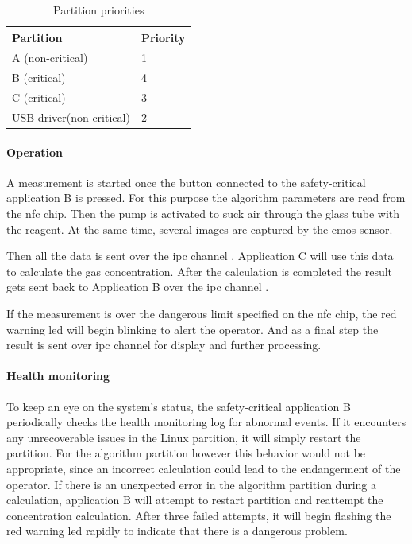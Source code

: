 \begin{table}[h!]
\centering
\begin{tabular}{l|l}
\textbf{Partition} & \textbf{Priority} \\ \hline
A (non-critical)                             & 1                                           \\ \hline
B (critical)                                 & 4                                           \\ \hline
C (critical)                                 & 3                                           \\ \hline
USB driver(non-critical)                     & 2                                          
\end{tabular}
\caption{Partition priorities}
\label{table:gasdetect_priorities}
\end{table}

\paragraph{Operation}


A measurement is started once the button connected to the safety-critical application B is pressed. For this purpose the algorithm parameters are read from the \acrshort{nfc} chip. Then the pump is activated to suck air through the glass tube with the reagent. At the same time, several images are captured by the \acrshort{cmos} sensor.

Then all the data is sent over the \acrshort{ipc} channel \bToc. Application C will use this data to calculate the gas concentration. After the calculation is completed the result gets sent back to Application B over the \acrshort{ipc} channel \cTob.

If the measurement is over the dangerous limit specified on the \acrshort{nfc} chip, the red warning \acrshort{led} will begin blinking to alert the operator. And as a final step the result is sent over \acrshort{ipc} channel \bToa for display and further processing.

\paragraph{Health monitoring}
To keep an eye on the system's status, the safety-critical application B periodically checks the health monitoring log for abnormal events. If it encounters any unrecoverable issues in the Linux partition, it will simply restart the partition. 
For the algorithm partition however this behavior would not be appropriate, since an incorrect calculation could lead to the endangerment of the operator. If there is an unexpected error in the algorithm partition during a calculation, application B will attempt to restart partition and reattempt the concentration calculation. After three failed attempts, it will begin flashing the red warning \acrshort{led} rapidly to indicate that there is a dangerous problem.

